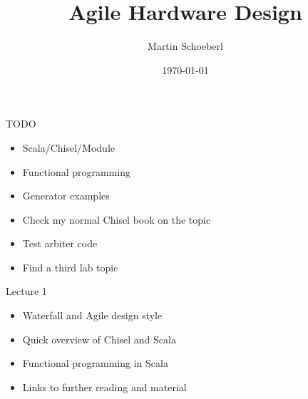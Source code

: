 

\newif\ifbook


\usepackage{tikz}
\usetikzlibrary{positioning, arrows.meta}


\title{Agile Hardware Design}
\author{Martin Schoeberl}
\date{\today}



\begin{frame}
\titlepage
\end{frame}


\begin{frame}[fragile]{TODO}
\begin{itemize}
\item Scala/Chisel/Module
\item Functional programming
\item Generator examples
\item Check my normal Chisel book on the topic
\item Test arbiter code
\item Find a third lab topic
\end{itemize}
\end{frame}

\begin{frame}[fragile]{Lecture 1}
\begin{itemize}
\item Waterfall and Agile design style
\item Quick overview of Chisel and Scala
\item Functional programming in Scala
\item Links to further reading and material
\end{itemize}
\end{frame}


